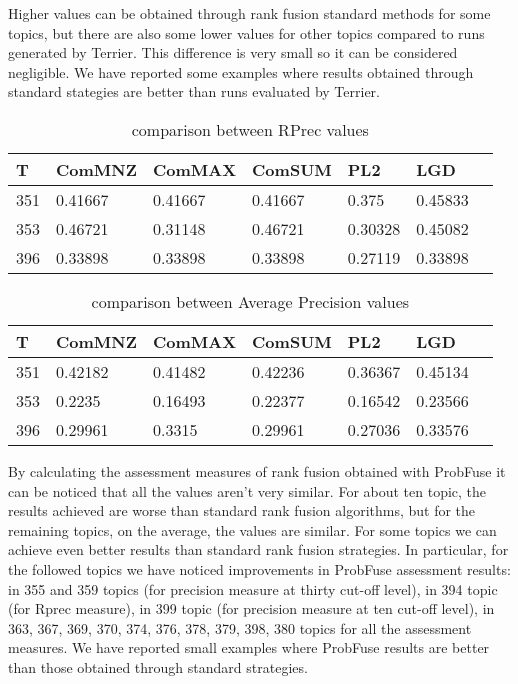 \documentclass[12pt,journal]{IEEEtran}
\begin{document}
Higher values can be obtained through rank fusion standard methods for some topics, but there are also some lower values for other topics compared to runs generated by Terrier. This difference is very small so it can be considered negligible. We have reported some examples where results obtained through standard stategies are better than runs evaluated by Terrier. \\
\begin{table}[h!]
\centering
\caption{comparison between RPrec values}
\begin{tabular}{|l|l|l|l|l|l|l|}
\hline
T   & ComMNZ  & ComMAX  & ComSUM  & PL2  & LGD \\ \hline
351 & 0.41667 & 0.41667 & 0.41667 & 0.375   & 0.45833 \\ \hline
353 & 0.46721 & 0.31148 & 0.46721 & 0.30328 & 0.45082 \\ \hline
396 & 0.33898 & 0.33898 & 0.33898 & 0.27119 & 0.33898 \\ \hline 
\end{tabular}
\end{table}

\begin{table}[h!]
\centering
\caption{comparison between Average Precision values}
\begin{tabular}{|l|l|l|l|l|l|l|}
\hline
T   & ComMNZ  & ComMAX  & ComSUM  & PL2  & LGD  \\ \hline
351 & 0.42182 & 0.41482 & 0.42236 & 0.36367 & 0.45134 \\ \hline
353 & 0.2235  & 0.16493 & 0.22377 & 0.16542 & 0.23566 \\ \hline
396 & 0.29961 & 0.3315  & 0.29961 & 0.27036 & 0.33576 \\ \hline
\end{tabular}
\end{table} 

By calculating the assessment measures of rank fusion obtained with ProbFuse it can be noticed that all the values aren’t very similar. For about ten topic, the results achieved are worse than standard rank fusion algorithms, but for the remaining topics, on the average, the values are similar. For some topics we can achieve even better results than standard rank fusion strategies.
In particular, for the followed topics we have noticed improvements in ProbFuse assessment results: in 355 and 359 topics (for precision measure at thirty cut-off level), in 394 topic (for Rprec measure), in 399 topic (for precision measure at ten cut-off level), in 363, 367, 369, 370, 374, 376, 378, 379, 398, 380 topics for all the assessment measures. We have reported small examples where ProbFuse results are better than those obtained through standard strategies. \\
\end{document}
